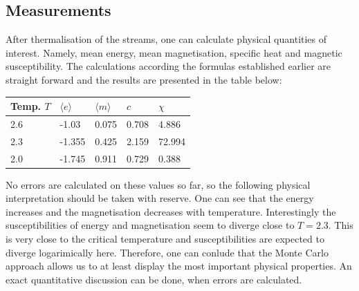 \documentclass[11pt, a4paper]{scrartcl}
\begin{document}
\subsection{Measurements}
After thermalisation of the streams, one can calculate physical quantities of interest. Namely, mean energy, mean magnetisation, specific heat and magnetic susceptibility. The calculations according the formulas established earlier are straight forward and the results are presented in the table below:
\begin{center}
\begin{tabular}{ | m{2cm} || m{2cm}| m{2cm} | m{2cm} | m{2cm} | }
  \hline
  Temp. $T$ & $\langle e \rangle$ & $\langle m \rangle$ & $c$ & $\chi$\\
  \hline
  2.6 & -1.03 & 0.075 & 0.708 & 4.886\\
  \hline
  2.3 & -1.355 & 0.425 & 2.159 & 72.994\\
  \hline
  2.0 & -1.745 & 0.911 & 0.729 & 0.388 \\
  \hline
\end{tabular}
\end{center}
No errors are calculated on these values so far, so the following physical interpretation should be taken with reserve. One can see that the energy increases and the magnetisation decreases with temperature. Interestingly the susceptibilities of energy and magnetisation seem to diverge close to $T = 2.3$. This is very close to the critical temperature and susceptibilities are expected to diverge logarimically here. Therefore, one can conlude that the Monte Carlo approach allows us to at least display the most important physical properties. An exact quantitative discussion can be done, when errors are calculated. 
\end{document}
